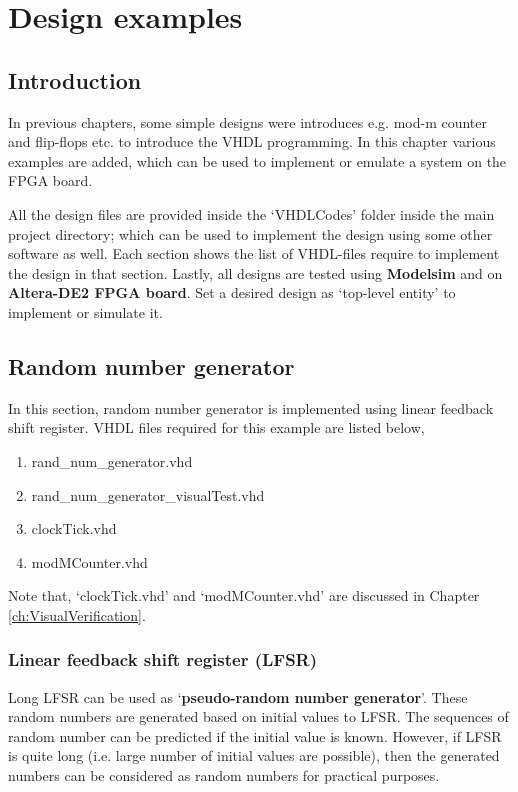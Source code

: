 \chapter{Design examples} \label{ch:ExamplesBasicDesigns}

\graphicspath{{Chapters/DesignExamples/Figures/}}


%

\section{Introduction}
In previous chapters, some simple designs were introduces e.g. mod-m counter and flip-flops etc. to introduce the VHDL programming. In this chapter various examples are added, which can be used to implement or emulate a system on the FPGA board. 

All the design files are provided inside the `VHDLCodes' folder inside the main project directory; which can be used to implement the design using some other software as well. Each section shows the list of VHDL-files require to implement the design in that section. Lastly, all designs are tested using \textbf{Modelsim} and on \textbf{Altera-DE2 FPGA board}. Set a desired design as `top-level entity' to implement or simulate it. 

\section{Random number generator}
In this section, random number generator is implemented using linear feedback shift register. VHDL files required for this example are listed below, 
\begin{enumerate}
	\item rand\_num\_generator.vhd
	\item rand\_num\_generator\_visualTest.vhd
	\item clockTick.vhd
	\item modMCounter.vhd
\end{enumerate}
Note that, `clockTick.vhd' and `modMCounter.vhd' are discussed in Chapter \ref{ch:VisualVerification}.

\subsection{Linear feedback shift register (LFSR)}
Long LFSR can be used as `\textbf{pseudo-random number generator}'.  These random numbers are generated based on initial values to LFSR. The sequences of random number can be predicted if the initial value is known. However, if LFSR is quite long (i.e. large number of initial values are possible), then the generated numbers can be considered as random numbers for practical purposes.  

